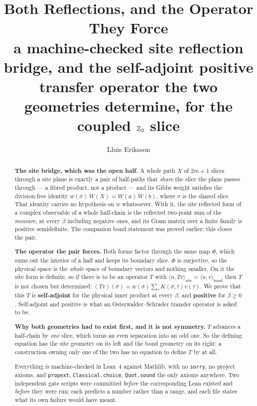 \documentclass[11pt]{article}
\title{Both Reflections, and the Operator They Force\\
\large a machine-checked site reflection bridge, and the self-adjoint positive
transfer operator the two geometries determine, for the coupled $\mathbb{Z}_2$ slice}
\author{Lluis Eriksson}
\date{}
\theoremstyle{definition}
\begin{document}
\maketitle

\begin{abstract}
\textbf{The site bridge, which was the open half.}  A whole path $X$ of $2m+1$
slices through a site plane is exactly a pair of half-paths that \emph{share}
the slice the plane passes through --- a fibred product, not a product --- and
its Gibbs weight satisfies the division-free identity
$w(\sigma)\,W(X)=W(a)\,W(b)$, where $\sigma$ is the shared slice.  That identity
carries no hypothesis on $w$ whatsoever.  With it, the site reflected form of a
complex observable of a whole half-chain is the reflected two-point sum of the
\emph{measure}, at every $\beta$ including negative ones, and its Gram matrix
over a finite family is positive semidefinite.  The companion bond statement was
proved earlier; this closes the pair.

\textbf{The operator the pair forces.}  Both forms factor through the same map
$\Phi$, which sums out the interior of a half and keeps its boundary slice.
$\Phi$ is surjective, so the physical space is the \emph{whole} space of
boundary vectors and nothing smaller.  On it the site form is definite, so if
there is to be an operator $T$ with
$\langle u,Tv\rangle_{\mathrm{site}}=\langle u,v\rangle_{\mathrm{bond}}$ then
$T$ is not chosen but determined: $(Tv)(\sigma)=w(\sigma)\sum_\tau
K(\sigma,\tau)v(\tau)$.  We prove that this $T$ is \textbf{self-adjoint} for the
physical inner product at every $\beta$, and \textbf{positive} for $\beta\ge0$.
Self-adjoint and positive is what an Osterwalder--Schrader transfer operator is
asked to be.

\textbf{Why both geometries had to exist first, and it is not symmetry.}  $T$
advances a half-chain by \emph{one} slice, which turns an even separation into
an odd one.  So the defining equation has the site geometry on its left and the
bond geometry on its right: a construction owning only one of the two has no
equation to define $T$ by at all.

Everything is machine-checked in Lean~4 against Mathlib, with no \texttt{sorry},
no project axioms, and \texttt{propext}, \texttt{Classical.choice},
\texttt{Quot.sound} the only axioms anywhere.  Two independent gate scripts were
committed \emph{before} the corresponding Lean existed and \emph{before} they
were run; each predicts a number rather than a range, and each file states what
its own failure would have meant.


\end{abstract}
\end{document}
